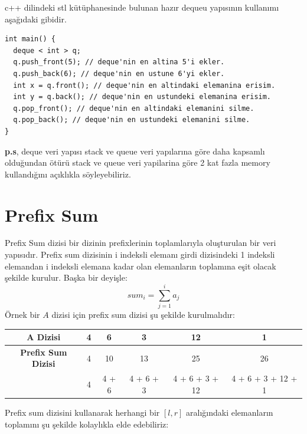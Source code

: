 \documentclass[12pt]{article}
\begin{document}
    c++ dilindeki stl k\"{u}t\"{u}phanesinde bulunan haz{\i}r dequeu yap{\i}s{\i}n{\i}n kullan{\i}m{\i} a\c{s}a\u{g}{\i}daki gibidir.    
    
    \begin{verbatim}
int main() {
  deque < int > q;
  q.push_front(5); // deque'nin en altina 5'i ekler.
  q.push_back(6); // deque'nin en ustune 6'yi ekler.
  int x = q.front(); // deque'nin en altindaki elemanina erisim.
  int y = q.back(); // deque'nin en ustundeki elemanina erisim.
  q.pop_front(); // deque'nin en altindaki elemanini silme.
  q.pop_back(); // deque'nin en ustundeki elemanini silme.
}
    \end{verbatim}
    \textbf{p.s}, deque veri yap{\i}s{\i} stack ve queue veri yap{\i}lar{\i}na g\"{o}re daha kapsaml{\i} oldu\u{g}undan \"{o}t\"{u}r\"{u} stack ve queue veri yapilarina g\"{o}re 2 kat fazla memory kulland{\i}\u{g}{\i}n{\i} a\c{c}{\i}kl{\i}kla s\"{o}yleyebiliriz.
    \cleardoublepage

	           \section{Prefix Sum} \label{prefixsum}
	
	Prefix Sum dizisi bir dizinin prefixlerinin toplamlar{\i}yla olu\c{s}turulan bir veri yap{\i}s{\i}d{\i}r. Prefix sum dizisinin i indeksli eleman{\i} girdi dizisindeki 1 indeksli elemandan i indeksli elemana kadar olan elemanlar{\i}n toplam{\i}na e\c{s}it olacak \c{s}ekilde kurulur. Ba\c{s}ka bir deyi\c{s}le: $$sum_i = \sum_{j=1}^{i} {a_j} $$ \"{O}rnek bir $A$ dizisi i\c{c}in prefix sum dizisi \c{s}u \c{s}ekilde kurulmal{\i}d{\i}r:

    \begin{table}[h]
    \centering
    \begin{tabular}{|c|c|c|c|c|c|}
    \hline
    \textbf{A Dizisi} & 4 & 6 & 3 & 12 & 1 \\ \hline
    \textbf{Prefix Sum Dizisi} & 4 & 10 & 13 & 25 & 26 \\ \hline
     & \cellcolor[HTML]{F8FF00}4 & \cellcolor[HTML]{F8FF00}4 + 6 & \cellcolor[HTML]{F8FF00}4 + 6 + 3 & \cellcolor[HTML]{F8FF00}4 + 6 + 3 + 12 & \cellcolor[HTML]{F8FF00}4 + 6 + 3 + 12 + 1 \\ \hline
    \end{tabular}
    \end{table}

	Prefix sum dizisini kullanarak herhangi bir $[l,r]$ aral{\i}\u{g}{\i}ndaki elemanlar{\i}n toplam{\i}n{\i} \c{s}u \c{s}ekilde kolayl{\i}kla elde edebiliriz:
	
\end{document}
